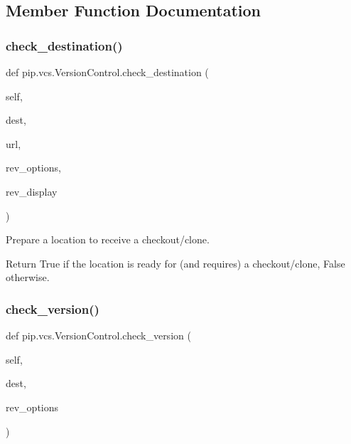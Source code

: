 \subsection{Member Function Documentation}
\mbox{\label{classpip_1_1vcs_1_1_version_control_aa75c5ce1487ef8f34e91b6a0d46bc561}} 
\subsubsection{\texorpdfstring{check\+\_\+destination()}{check\_destination()}}
{\footnotesize\ttfamily def pip.\+vcs.\+Version\+Control.\+check\+\_\+destination (\begin{DoxyParamCaption}\item[{}]{self,  }\item[{}]{dest,  }\item[{}]{url,  }\item[{}]{rev\+\_\+options,  }\item[{}]{rev\+\_\+display }\end{DoxyParamCaption})}

\begin{DoxyVerb}Prepare a location to receive a checkout/clone.

Return True if the location is ready for (and requires) a
checkout/clone, False otherwise.
\end{DoxyVerb}
 \mbox{\label{classpip_1_1vcs_1_1_version_control_abc7a71e49906cb31fedaddbe55bf049d}} 
\subsubsection{\texorpdfstring{check\+\_\+version()}{check\_version()}}
{\footnotesize\ttfamily def pip.\+vcs.\+Version\+Control.\+check\+\_\+version (\begin{DoxyParamCaption}\item[{}]{self,  }\item[{}]{dest,  }\item[{}]{rev\+\_\+options }\end{DoxyParamCaption})}

